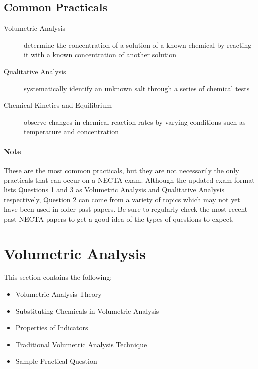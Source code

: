 \subsection{Common Practicals}
\begin{description}
\item[Volumetric Analysis]{determine the concentration of a solution of a known chemical by reacting it with a known concentration of another solution}
\item[Qualitative Analysis]{systematically identify an unknown salt through a series of chemical tests}
\item[Chemical Kinetics and Equilibrium]{observe changes in chemical reaction rates by varying conditions such as temperature and concentration}
\end{description}

\paragraph{Note} These are the most common practicals, but they are not necessarily the only practicals that can occur on a NECTA exam. Although the updated exam format lists Questions 1 and 3 as Volumetric Analysis and Qualitative Analysis respectively, Question 2 can come from a variety of topics which may not yet have been used in older past papers. Be sure to regularly check the most recent past NECTA papers to get a good idea of the types of questions to expect. 


\section{Volumetric Analysis}   

This section contains the following:
\begin{itemize}
\item Volumetric Analysis Theory
\item Substituting Chemicals in Volumetric Analysis
\item Properties of Indicators
\item Traditional Volumetric Analysis Technique
\item Sample Practical Question
\end{itemize}

